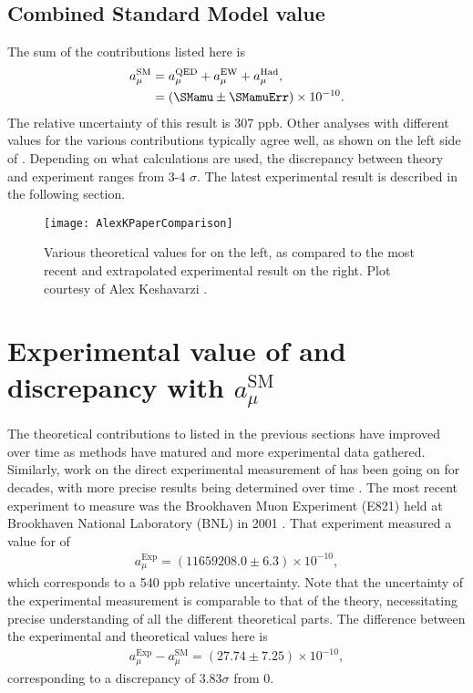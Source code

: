 \subsection{Combined Standard Model value}

The sum of the \amu contributions listed here is
		\begin{equation}
		\begin{aligned}
            a_{\mu}^{\text{SM}} &= a_{\mu}^{\text{QED}} + a_{\mu}^{\text{EW}} + a_{\mu}^{\text{Had}}, \\
			&= (\SMamu \pm \SMamuErr) \times 10^{-10}.
		\end{aligned}
		\end{equation}
The relative uncertainty of this result is 307 ppb. Other analyses with different values for the various contributions typically agree well, as shown on the left side of . Depending on what calculations are used, the discrepancy between theory and experiment ranges from 3-4 $\sigma$. The latest experimental result is described in the following section.

\begin{figure}[]
	\centering
	\texttt{[image: AlexKPaperComparison]}
	\caption[Comparison between theoretical and experimental values for \amu]{Various theoretical values for \amu on the left, as compared to the most recent and extrapolated experimental result on the right. Plot courtesy of Alex Keshavarzi \cite{Keshavarzi:2018mgv}.}
	\label{fig:AlexKPaperComparison}
\end{figure}


\section{Experimental value of \amu and discrepancy with \texorpdfstring{$a_{\mu}^{\text{SM}}$}{amusm}}
\label{sec:Background}


The theoretical contributions to \amu listed in the previous sections have improved over time as methods have matured and more experimental data gathered. Similarly, work on the direct experimental measurement of \amu has been going on for decades, with more precise results being determined over time \cite{PastExperiments}. The most recent experiment to measure \gmtwo was the Brookhaven Muon \gmtwo Experiment (E821) held at Brookhaven National Laboratory (BNL) in 2001 \cite{E821FinalReport}. That experiment measured a value for \amu of 
		\begin{align}
            a_{\mu}^{\text{Exp}} = (11659208.0 \pm 6.3) \times 10^{-10},
		\end{align}
which corresponds to a 540 ppb relative uncertainty. Note that the uncertainty of the experimental measurement is comparable to that of the theory, necessitating precise understanding of all the different theoretical parts. The difference between the experimental and theoretical values here is
		\begin{align}
            a_{\mu}^{\text{Exp}} - a_{\mu}^{\text{SM}} = (27.74 \pm 7.25) \times 10^{-10},
		\end{align}
corresponding to a discrepancy of 3.83$\sigma$ from 0.



